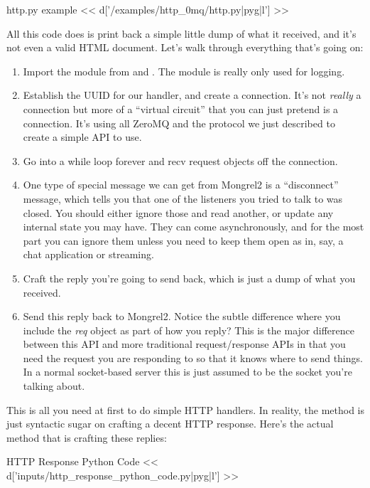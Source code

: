 \begin{code}{http.py example}
 << d['/examples/http_0mq/http.py|pyg|l'] >>
\end{code}

All this code does is print back a simple little dump of what it received, and
it's not even a valid HTML document.  Let's walk through everything that's going on:

\begin{enumerate}
\item Import the  module from  and .  The  module is
    really only used for logging.
\item Establish the UUID for our handler, and create a connection.  It's not \emph{really} a connection
    but more of a ``virtual circuit'' that you can just pretend is a connection.  It's using all ZeroMQ and
    the protocol we just described to create a simple API to use.
\item Go into a while loop forever and recv request objects off the connection.
\item One type of special message we can get from Mongrel2 is a ``disconnect'' message, which tells you that
    one of the listeners you tried to talk to was closed.  You should either ignore those and read
    another, or update any internal state you may have.  They can come asynchronously, and for the most
    part you can ignore them unless you need to keep them open as in, say, a chat application or streaming.
\item Craft the reply you're going to send back, which is just a dump of what you received.
\item Send this reply back to Mongrel2.  Notice the subtle difference where you include the \emph{req} object
    as part of how you reply?  This is the major difference between this API and more traditional
    request/response APIs in that you need the request you are responding to so that it knows where to send
    things.  In a normal socket-based server this is just assumed to be the socket you're talking about.
\end{enumerate}

This is all you need at first to do simple HTTP handlers.  In reality, the  method is
just syntactic sugar on crafting a decent HTTP response.  Here's the actual method that is crafting these replies:

\begin{code}{HTTP Response Python Code}
<< d['inputs/http_response_python_code.py|pyg|l'] >>
\end{code}

